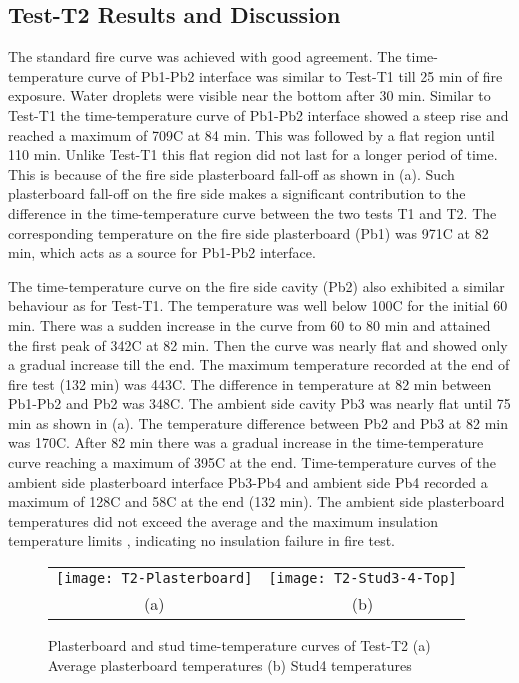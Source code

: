 \subsection{Test-T2 Results and Discussion}

The standard fire curve was achieved with good agreement. The time- temperature curve of Pb1-Pb2 interface was similar to Test-T1 till 25 min of fire exposure. Water droplets were visible near the bottom after 30 min. Similar to Test-T1 the time-temperature curve of Pb1-Pb2 interface showed a steep rise and reached a maximum of 709\degree C at 84 min. This was followed by a flat region until 110 min. Unlike Test-T1 this flat region did not last for a longer period of time. This is because of the fire side plasterboard fall-off as shown in  (a). Such plasterboard fall-off on the fire side makes a significant contribution to the difference in the time-temperature curve between the two tests T1 and T2. The corresponding temperature on the fire side plasterboard (Pb1) was 971\degree C at 82 min, which acts as a source for Pb1-Pb2 interface.

The time-temperature curve on the fire side cavity (Pb2) also exhibited a similar behaviour as for Test-T1. The temperature was well below 100\degree C for the initial 60 min. There was a sudden increase in the curve from 60 to 80 min and attained the first peak of 342\degree C at 82 min. Then the curve was nearly flat and showed only a gradual increase till the end. The maximum temperature recorded at the end of fire test (132 min) was 443\degree C. The difference in temperature at 82 min between Pb1-Pb2 and Pb2 was 348\degree C. The ambient side cavity Pb3 was nearly flat until 75 min as shown in  (a). The temperature difference between Pb2 and Pb3 at 82 min was 170\degree C. After 82 min there was a gradual increase in the time-temperature curve reaching a maximum of 395\degree C at the end. Time-temperature curves of the ambient side plasterboard interface Pb3-Pb4 and ambient side Pb4 recorded a maximum of 128\degree C and 58\degree C at the end (132 min). The ambient side plasterboard temperatures did not exceed the average and the maximum insulation temperature limits \citet{StandardsAustral2014}, indicating no insulation failure in fire test.

\begin{figure}[!htbp]
	\centering
		\begin{tabular}{cc}
			\texttt{[image: T2-Plasterboard]} & \texttt{[image: T2-Stud3-4-Top]} \\ 
			(a) & (b)  \\ 
		\end{tabular} 
		\caption{Plasterboard and stud time-temperature curves of Test-T2 (a) Average plasterboard temperatures (b) Stud4 temperatures}
		\label{fig:T2-PB-Stud}
\end{figure}

